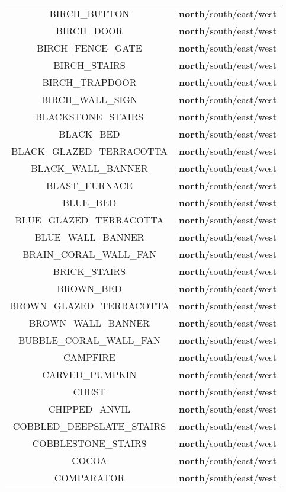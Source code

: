 \begin{longtable}{ |c|c| }
	BIRCH\_BUTTON & \textbf{north}/south/east/west \\
	BIRCH\_DOOR & \textbf{north}/south/east/west \\
	BIRCH\_FENCE\_GATE & \textbf{north}/south/east/west \\
	BIRCH\_STAIRS & \textbf{north}/south/east/west \\
	BIRCH\_TRAPDOOR & \textbf{north}/south/east/west \\
	BIRCH\_WALL\_SIGN & \textbf{north}/south/east/west \\
	BLACKSTONE\_STAIRS & \textbf{north}/south/east/west \\
	BLACK\_BED & \textbf{north}/south/east/west \\
	BLACK\_GLAZED\_TERRACOTTA & \textbf{north}/south/east/west \\
	BLACK\_WALL\_BANNER & \textbf{north}/south/east/west \\
	BLAST\_FURNACE & \textbf{north}/south/east/west \\
	BLUE\_BED & \textbf{north}/south/east/west \\
	BLUE\_GLAZED\_TERRACOTTA & \textbf{north}/south/east/west \\
	BLUE\_WALL\_BANNER & \textbf{north}/south/east/west \\
	BRAIN\_CORAL\_WALL\_FAN & \textbf{north}/south/east/west \\
	BRICK\_STAIRS & \textbf{north}/south/east/west \\
	BROWN\_BED & \textbf{north}/south/east/west \\
	BROWN\_GLAZED\_TERRACOTTA & \textbf{north}/south/east/west \\
	BROWN\_WALL\_BANNER & \textbf{north}/south/east/west \\
	BUBBLE\_CORAL\_WALL\_FAN & \textbf{north}/south/east/west \\
	CAMPFIRE & \textbf{north}/south/east/west \\
	CARVED\_PUMPKIN & \textbf{north}/south/east/west \\
	CHEST & \textbf{north}/south/east/west \\
	CHIPPED\_ANVIL & \textbf{north}/south/east/west \\
	COBBLED\_DEEPSLATE\_STAIRS & \textbf{north}/south/east/west \\
	COBBLESTONE\_STAIRS & \textbf{north}/south/east/west \\
	COCOA & \textbf{north}/south/east/west \\
	COMPARATOR & \textbf{north}/south/east/west \\

\end{longtable}
